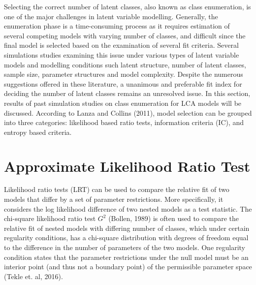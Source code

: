 Selecting the correct number of latent classes, also known as class enumeration, is one of the major challenges in latent variable modelling. Generally, the enumeration phase is a time-consuming process as it requires estimation of several competing models with varying number of classes, and difficult since the final model is selected based on the examination of several fit criteria. Several simulations studies examining this issue under various types of latent variable models and modelling conditions such latent structure, number of latent classes, sample size, parameter structures and model complexity. Despite the numerous suggestions offered in these literature, a unanimous and preferable fit index for deciding the number of latent classes remains an unresolved issue. In this section, results of past simulation studies on class enumeration for LCA models will be discussed. According to Lanza and Collins (2011), model selection can be grouped into three categories: likelihood based ratio tests, information criteria (IC), and entropy based criteria. 


\section{Approximate Likelihood Ratio Test}
\hspace{2em} Likelihood ratio tests (LRT) can be used to compare the relative fit of two models that differ by a set of parameter restrictions. More specifically, it considers the log likelihood difference of two nested models as a test statistic. The chi-square likelihood ratio test $G^{2}$ (Bollen, 1989) is often used to compare the relative fit of nested models with differing number of classes, which under certain regularity conditions, has a chi-square distribution with degrees of freedom equal to the difference in the number of parameters of the two models. One regularity condition states that the parameter restrictions under the null model must be an interior point (and thus not a boundary point) of the permissible parameter space (Tekle et. al, 2016). 

